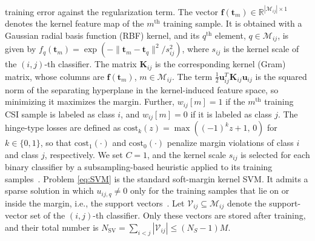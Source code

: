 {training error against the regularization term. The vector
$\mathbf{f}(\mathbf{t}_m)\in\mathbb{R}^{|\mathcal{M}_{ij}|\times 1}$
denotes the kernel feature map of the $m^{\text{th}}$ training sample.
It is obtained with a Gaussian radial basis function (RBF) kernel, and
its $q^{\text{th}}$ element, $q\in\mathcal{M}_{ij}$, is given by
$f_q(\mathbf{t}_m) = \exp\!\left(-\|\mathbf{t}_m -\mathbf{t}_q\|^2/s_{ij}^2\right)$,
where $s_{ij}$ is the kernel scale of the $(i,j)$-th classifier. The
matrix $\mathbf{K}_{ij}$ is the corresponding kernel (Gram) matrix, whose
columns are $\mathbf{f}(\mathbf{t}_m)$, $m\in\mathcal{M}_{ij}$. The term
$\tfrac{1}{2}\mathbf{u}_{ij}^T\mathbf{K}_{ij}\mathbf{u}_{ij}$ is the
squared norm of the separating hyperplane in the kernel-induced feature
space, so minimizing it maximizes the margin. Further, $w_{ij}[m]=1$ if
the $m^{\text{th}}$ training CSI sample is labeled as class $i$, and
$w_{ij}[m]=0$ if it is labeled as class $j$. The hinge-type losses are
defined as $\text{cost}_k(z)=\max\!\left((-1)^k z+1,\,0\right)$ for
$k\in\{0,1\}$, so that $\text{cost}_1(\cdot)$ and $\text{cost}_0(\cdot)$
penalize margin violations of class $i$ and class $j$, respectively.
We set $C=1$, and the kernel scale $s_{ij}$ is selected for each binary
classifier by a subsampling-based heuristic applied to its training
samples~\cite{MathWorks_fitcecoc}.
Problem \eqref{eq:SVM} is the standard soft-margin kernel SVM. It admits
a sparse solution in which $u_{ij,q}\neq 0$ only for the training samples
that lie on or inside the margin, i.e., the support
vectors~\cite{Bottou_Lin_2007_LSKM}. Let
$\mathcal{V}_{ij}\subseteq\mathcal{M}_{ij}$ denote the support-vector set
of the $(i,j)$-th classifier. Only these vectors are stored after
training, and their total number is
$N_{\mathrm{SV}}=\sum_{i<j}|\mathcal{V}_{ij}|\leq (N_S-1)M$.

}
